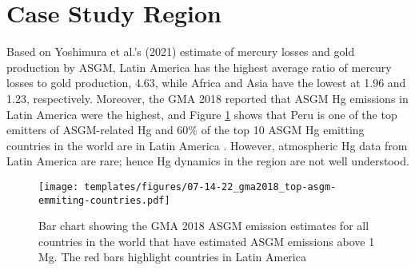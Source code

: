 \section{Case Study Region}
\begin{flushleft}
Based on Yoshimura et al.'s (2021) estimate of mercury losses and gold production by ASGM, Latin America has the highest average ratio of mercury losses to gold production, 4.63, while Africa and Asia have the lowest at 1.96 and 1.23, respectively. Moreover, the GMA 2018 reported that ASGM Hg emissions in Latin America were the highest, and Figure \ref{fig:global_asgm_emissions_above_a_tone_barchart} shows that Peru is one of the top emitters of ASGM-related Hg and 60\% of the top 10 ASGM Hg emitting countries in the world are in Latin America  \cite{united_nations_environment_programme_technical_2019}. However, atmospheric Hg data from Latin America are rare; hence Hg dynamics in the region are not well understood. 
\end{flushleft}
\begin{figure}[H]
  \texttt{[image: templates/figures/07-14-22\_gma2018\_top-asgm-emmiting-countries.pdf]}
  \centering
  \caption{Bar chart showing the GMA 2018 ASGM \hg emission estimates for all countries in the world that have estimated ASGM \hg emissions above 1 Mg. The red bars highlight countries in Latin America \cite{united_nations_environment_programme_technical_2019}}
  \label{fig:global_asgm_emissions_above_a_tone_barchart}
\end{figure}
\FloatBarrier
